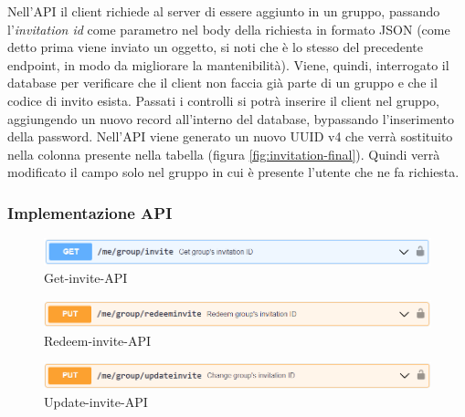 \documentclass[main.tex]{subfiles}
\begin{document}
\newline
Nell'API  il client richiede al server di essere aggiunto in un gruppo, passando l'\emph{invitation id} come parametro nel body della richiesta in formato JSON (come detto prima viene inviato un oggetto, si noti che è lo stesso del precedente endpoint, in modo da migliorare la mantenibilità).
\newline
Viene, quindi, interrogato il database per verificare che il client non faccia già parte di un gruppo e che il codice di invito esista. Passati i controlli si potrà inserire il client nel gruppo, aggiungendo un nuovo record all'interno del database, bypassando l'inserimento della password.
\newline
Nell'API  viene generato un nuovo UUID v4 che verrà sostituito nella colonna  presente nella tabella  (figura \ref{fig:invitation-final}).
Quindi verrà modificato il campo solo nel gruppo in cui è presente l'utente che ne fa richiesta.


\subsubsection{Implementazione API}
\begin{figure}[H]
    \centering
    \includegraphics[width=1\linewidth]{img/add-link-task/get-invite-API.PNG}
    \caption{Get-invite-API}
\end{figure}


\begin{figure}[H]
    \centering
    \includegraphics[width=1\linewidth]{img/add-link-task/redeem-invite-API.PNG}
    \caption{Redeem-invite-API}
\end{figure}


\begin{figure}[H]
    \centering
    \includegraphics[width=1\linewidth]{img/add-link-task/update-invite-API.PNG}
    \caption{Update-invite-API}
\end{figure}

\end{document}
